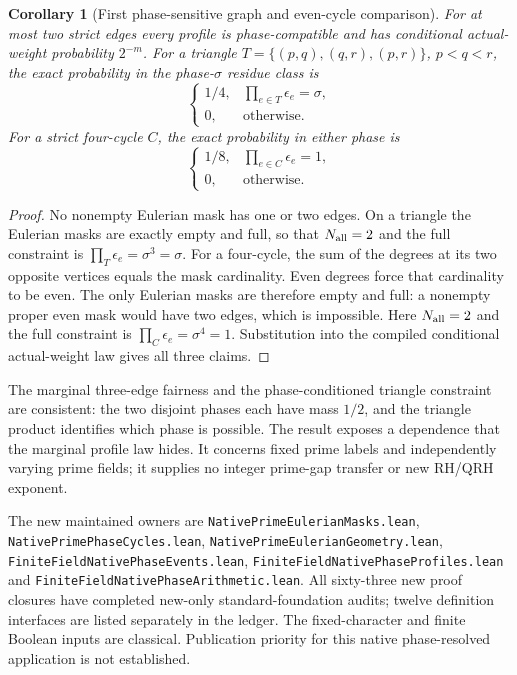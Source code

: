 \documentclass[11pt]{article}
\newtheorem{corollary}[theorem]{Corollary}
\begin{document}
\begin{corollary}[First phase-sensitive graph and even-cycle comparison]
\label{cor:native-phase-small-graphs}
For at most two strict edges every profile is phase-compatible and has
conditional actual-weight probability \(2^{-m}\).
For a triangle \(T=\{(p,q),(q,r),(p,r)\}\), \(p<q<r\),
the exact probability in the phase-\(\sigma\) residue class is
\[
 \begin{cases}
 1/4,&\prod_{e\in T}\epsilon_e=\sigma,\\
 0,&\text{otherwise}.
 \end{cases}
\]
For a strict four-cycle \(C\), the exact probability in either phase is
\[
 \begin{cases}
 1/8,&\prod_{e\in C}\epsilon_e=1,\\
 0,&\text{otherwise}.
 \end{cases}
\]
\end{corollary}
\begin{proof}
No nonempty Eulerian mask has one or two edges.
On a triangle the Eulerian masks are exactly empty and full, so that
\(N_{\rm all}=2\) and the full constraint is
\(\prod_T\epsilon_e=\sigma^3=\sigma\).
For a four-cycle, the sum of the degrees at its two opposite vertices
equals the mask cardinality. Even degrees force that cardinality to
be even. The only Eulerian masks are therefore empty and full:
a nonempty proper even mask would have two edges, which is impossible.
Here \(N_{\rm all}=2\) and the full constraint is
\(\prod_C\epsilon_e=\sigma^4=1\).
Substitution into the compiled conditional actual-weight law gives
all three claims.
\end{proof}

The marginal three-edge fairness and the phase-conditioned triangle
constraint are consistent: the two disjoint phases each have mass
\(1/2\), and the triangle product identifies which phase is possible.
The result exposes a dependence that the marginal profile law hides.
It concerns fixed prime labels and independently varying prime fields;
it supplies no integer prime-gap transfer or new RH/QRH exponent.

The new maintained owners are \texttt{NativePrimeEulerianMasks.lean},
\texttt{NativePrimePhaseCycles.lean},
\texttt{NativePrimeEulerianGeometry.lean},
\texttt{FiniteFieldNativePhaseEvents.lean},
\texttt{FiniteFieldNativePhaseProfiles.lean} and
\texttt{FiniteFieldNativePhaseArithmetic.lean}.
All sixty-three new proof closures have completed new-only
standard-foundation audits; twelve definition interfaces are listed
separately in the ledger. The fixed-character and finite Boolean
inputs are classical. Publication priority for this native
phase-resolved application is not established.
\end{document}

